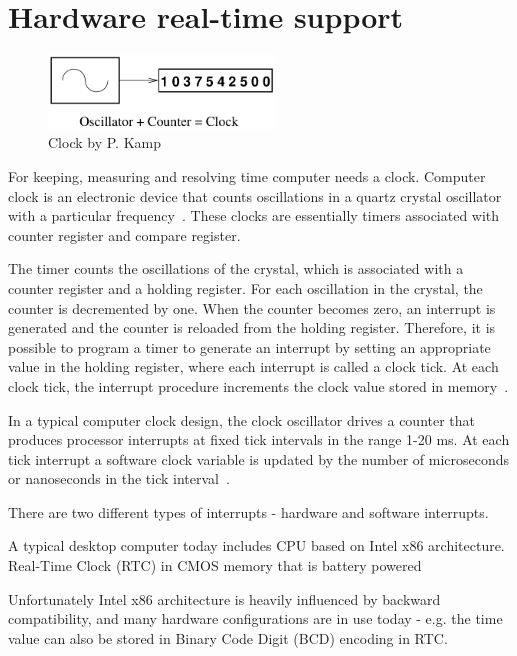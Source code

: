 
\chapter{Hardware real-time support}
\begin{figure}
	\centering
	\includegraphics[width=6cm,keepaspectratio]{fig/clock.png}
	\caption{Clock by P. Kamp}
	\label{fig:hw-clock}
\end{figure}
For keeping, measuring and resolving time computer needs a clock.
Computer clock is an electronic device that counts oscillations in a
quartz crystal oscillator with a particular frequency~\cite{thesis-sync}.
These clocks are essentially timers associated with counter register and
compare register.

The timer counts the oscillations of the crystal, which is associated with
a counter register and a holding register.
For each oscillation in the crystal, the counter is decremented by one.
When the counter becomes zero, an interrupt is generated and the
counter is reloaded from the holding register.
Therefore, it is possible to
program a timer to generate an interrupt by setting an appropriate value in
the holding register, where each interrupt is called a clock tick.
At each clock tick,
the interrupt procedure increments the clock value stored in memory~\cite{thesis-sync}.

In a typical computer clock design, the clock oscillator drives a counter that produces processor interrupts at
fixed tick intervals in the range 1-20 ms.
At each tick interrupt a software clock variable is updated by the
number of microseconds or nanoseconds in the tick interval~\cite{timecounters}.


There are two different types of interrupts - hardware and software interrupts.

A typical desktop computer today includes CPU based on Intel x86 architecture.
Real-Time Clock (RTC) in CMOS memory that is battery powered

Unfortunately Intel x86 architecture is heavily influenced by backward compatibility,
and many hardware configurations are in use today -
e.g. the time value can also be stored in Binary Code Digit (BCD) encoding in RTC.


